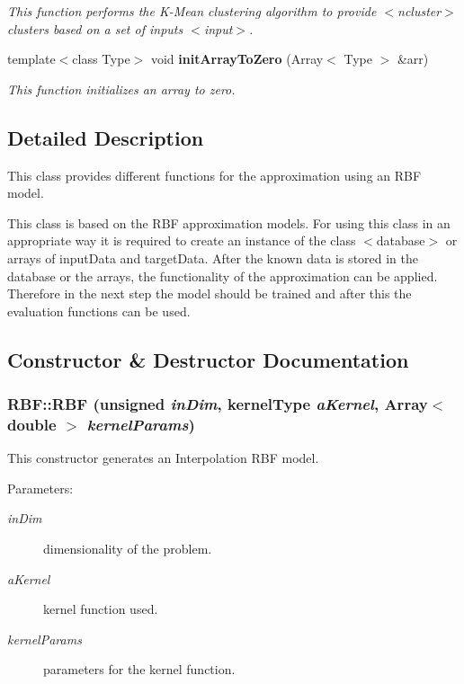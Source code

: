 \begin{CompactItemize}
\begin{CompactList}\small\item\em This function performs the K-Mean clustering algorithm to provide $<$ncluster$>$ clusters based on a set of inputs $<$input$>$. \item\end{CompactList}\item 
template$<$class Type$>$ void {\bf init\-Array\-To\-Zero} (Array$<$ Type $>$ \&arr)
\begin{CompactList}\small\item\em This function initializes an array to zero. \item\end{CompactList}\end{CompactItemize}


\subsection{Detailed Description}
This class provides different functions for the approximation using an RBF model. 

This class is based on the RBF approximation models. For using this class in an appropriate way it is required to create an instance of the class $<$database$>$ or arrays of input\-Data and target\-Data. After the known data is stored in the database or the arrays, the functionality of the approximation can be applied. Therefore in the next step the model should be trained and after this the evaluation functions can be used. 



\subsection{Constructor \& Destructor Documentation}
\subsubsection{\setlength{\rightskip}{0pt plus 5cm}RBF::RBF (unsigned {\em in\-Dim}, kernel\-Type {\em a\-Kernel}, Array$<$ double $>$ {\em kernel\-Params})}\label{classRBF_a1}


This constructor generates an Interpolation RBF model. 

\begin{Desc}
\item[Parameters:]
\begin{description}
\item[{\em in\-Dim}]dimensionality of the problem. \item[{\em a\-Kernel}]kernel function used. \item[{\em kernel\-Params}]parameters for the kernel function.\end{description}
\end{Desc}
